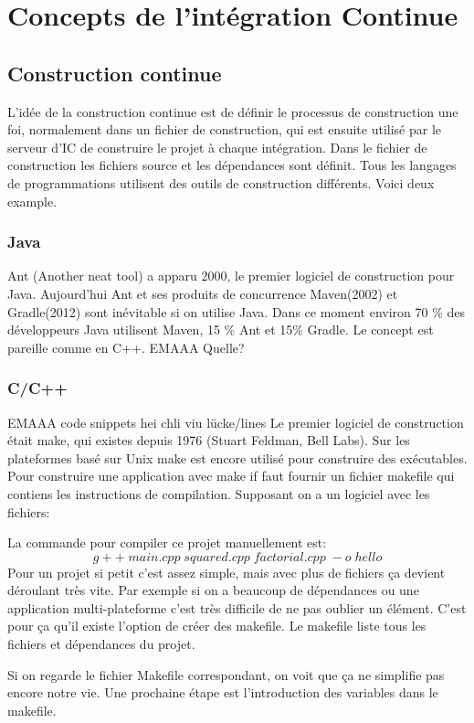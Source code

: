 \section{Concepts de l'intégration Continue}

\subsection{Construction continue}
L'idée de la construction continue est de définir le processus de construction une foi, normalement dans un fichier de construction, qui est ensuite utilisé par le serveur d'IC de construire le projet à chaque intégration. Dans le fichier de construction les fichiers source et les dépendances sont définit. Tous les langages de programmations utilisent des outils de construction différents. Voici deux example.

\subsubsection{Java}
Ant (Another neat tool) a apparu 2000, le premier logiciel de construction pour Java.
Aujourd'hui Ant et ses produits de concurrence Maven(2002) et Gradle(2012) sont inévitable si on utilise Java.
Dans ce moment environ 70 \% des développeurs Java utilisent Maven, 15 \% Ant et 15\% Gradle. Le concept est pareille comme en C++. EMAAA Quelle?
\subsubsection{C/C++}
EMAAA code snippets hei chli viu lücke/lines
Le premier logiciel de construction était make, qui existes depuis 1976 (Stuart Feldman, Bell Labs). Sur les plateformes basé sur Unix make est encore utilisé pour construire des exécutables.
Pour construire une application avec make if faut fournir un fichier makefile qui contiens les instructions de compilation. Supposant on a un logiciel avec les fichiers: 






La commande pour compiler ce projet manuellement est:
$$g++\;main.cpp\;squared.cpp\;factorial.cpp\;-o\;hello$$
Pour un projet si petit c'est assez simple, mais avec plus de fichiers ça devient déroulant très vite.
Par exemple si on a beaucoup de dépendances ou une application multi-plateforme c'est très difficile de ne pas oublier un élément.
\newpage
C'est pour ça qu'il existe l'option de créer des makefile. Le makefile liste tous les fichiers et dépendances du projet.

Si on regarde le fichier Makefile correspondant, on voit que ça ne simplifie pas encore notre vie. Une prochaine étape est l'introduction des variables dans le makefile.


